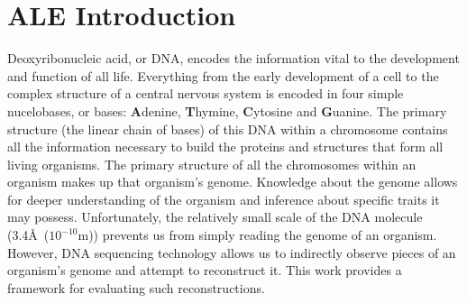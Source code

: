 \documentclass[phd,tocprelim]{cornell}
\begin{document}
\chapter{ALE Introduction} %
\label{cha:ALE Introduction}
\noindent
Deoxyribonucleic acid, or DNA, encodes the information vital to the development and function of all life. Everything from the early development of a cell to the complex structure of a central nervous system is encoded in four simple nucelobases, or bases: {\bf \color{red} A}denine, {\bf \color{blue} T}hymine, {\bf \color{MyDarkGreen} C}ytosine and {\bf \color{orange} G}uanine. The primary structure (the linear chain of bases) of this DNA within a chromosome contains all the information necessary to build the proteins and structures that form all living organisms. The primary structure of all the chromosomes within an organism makes up that organism's genome. Knowledge about the genome allows for deeper understanding of the organism and inference about specific traits it may possess. Unfortunately, the relatively small scale of the DNA molecule (3.4\AA\ ($10^{-10}$m)) prevents us from simply reading the genome of an organism. However, DNA sequencing technology allows us to indirectly observe pieces of an organism's genome and attempt to reconstruct it. This work provides a framework for evaluating such reconstructions.
\end{document}
